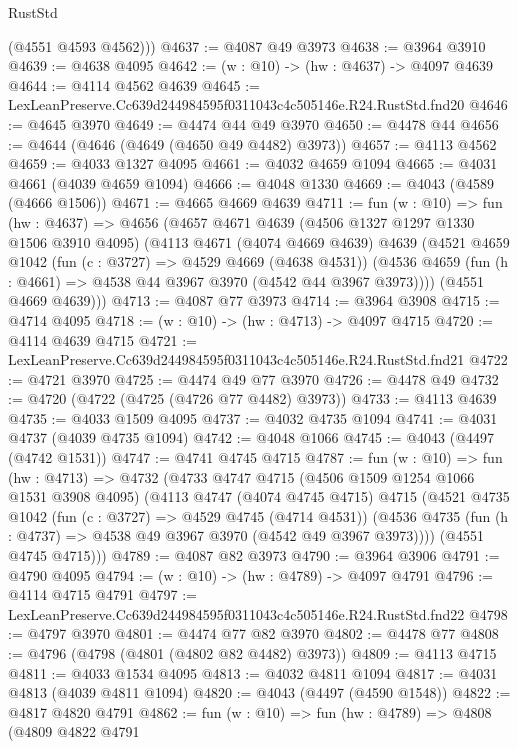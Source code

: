 \begin{lexlean}{RustStd}
\begin{coremodule}
        (@4551 @4593 @4562)))
@4637 := @4087 @49 @3973
@4638 := @3964 @3910
@4639 := @4638 @4095
@4642 := (w : @10) -> (hw : @4637) -> @4097 @4639
@4644 := @4114 @4562 @4639
@4645 := LexLeanPreserve.Cc639d244984595f0311043c4c505146e.R24.RustStd.fnd20
@4646 := @4645 @3970
@4649 := @4474 @44 @49 @3970
@4650 := @4478 @44
@4656 := @4644 (@4646 (@4649 (@4650 @49 @4482) @3973))
@4657 := @4113 @4562
@4659 := @4033 @1327 @4095
@4661 := @4032 @4659 @1094
@4665 := @4031 @4661 (@4039 @4659 @1094)
@4666 := @4048 @1330
@4669 := @4043 (@4589 (@4666 @1506))
@4671 := @4665 @4669 @4639
@4711 := fun (w : @10) =>
  fun (hw : @4637) =>
  @4656
    (@4657
      @4671
      @4639
      (@4506 @1327 @1297 @1330 @1506 @3910 @4095)
      (@4113
        @4671
        (@4074 @4669 @4639)
        @4639
        (@4521
          @4659
          @1042
          (fun (c : @3727) => @4529 @4669 (@4638 @4531))
          (@4536 @4659 (fun (h : @4661) => @4538 @44 @3967 @3970 (@4542 @44 @3967 @3973))))
        (@4551 @4669 @4639)))
@4713 := @4087 @77 @3973
@4714 := @3964 @3908
@4715 := @4714 @4095
@4718 := (w : @10) -> (hw : @4713) -> @4097 @4715
@4720 := @4114 @4639 @4715
@4721 := LexLeanPreserve.Cc639d244984595f0311043c4c505146e.R24.RustStd.fnd21
@4722 := @4721 @3970
@4725 := @4474 @49 @77 @3970
@4726 := @4478 @49
@4732 := @4720 (@4722 (@4725 (@4726 @77 @4482) @3973))
@4733 := @4113 @4639
@4735 := @4033 @1509 @4095
@4737 := @4032 @4735 @1094
@4741 := @4031 @4737 (@4039 @4735 @1094)
@4742 := @4048 @1066
@4745 := @4043 (@4497 (@4742 @1531))
@4747 := @4741 @4745 @4715
@4787 := fun (w : @10) =>
  fun (hw : @4713) =>
  @4732
    (@4733
      @4747
      @4715
      (@4506 @1509 @1254 @1066 @1531 @3908 @4095)
      (@4113
        @4747
        (@4074 @4745 @4715)
        @4715
        (@4521
          @4735
          @1042
          (fun (c : @3727) => @4529 @4745 (@4714 @4531))
          (@4536 @4735 (fun (h : @4737) => @4538 @49 @3967 @3970 (@4542 @49 @3967 @3973))))
        (@4551 @4745 @4715)))
@4789 := @4087 @82 @3973
@4790 := @3964 @3906
@4791 := @4790 @4095
@4794 := (w : @10) -> (hw : @4789) -> @4097 @4791
@4796 := @4114 @4715 @4791
@4797 := LexLeanPreserve.Cc639d244984595f0311043c4c505146e.R24.RustStd.fnd22
@4798 := @4797 @3970
@4801 := @4474 @77 @82 @3970
@4802 := @4478 @77
@4808 := @4796 (@4798 (@4801 (@4802 @82 @4482) @3973))
@4809 := @4113 @4715
@4811 := @4033 @1534 @4095
@4813 := @4032 @4811 @1094
@4817 := @4031 @4813 (@4039 @4811 @1094)
@4820 := @4043 (@4497 (@4590 @1548))
@4822 := @4817 @4820 @4791
@4862 := fun (w : @10) =>
  fun (hw : @4789) =>
  @4808
    (@4809
      @4822
      @4791

\end{coremodule}
\end{lexlean}

